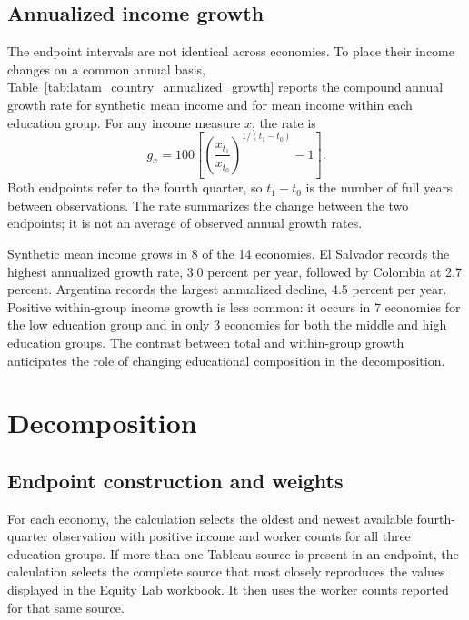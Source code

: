 \documentclass[11pt]{article}
\begin{document}


\subsection{Annualized income growth}

The endpoint intervals are not identical across economies. To place their
income changes on a common annual basis,
Table~\ref{tab:latam_country_annualized_growth} reports the compound annual
growth rate for synthetic mean income and for mean income within each
education group. For any income measure \(x\), the rate is
\[
  g_x=100\left[
    \left(\frac{x_{t_1}}{x_{t_0}}\right)^{1/(t_1-t_0)}-1
  \right].
\]
Both endpoints refer to the fourth quarter, so \(t_1-t_0\) is the number of
full years between observations. The rate summarizes the change between the
two endpoints; it is not an average of observed annual growth rates.



Synthetic mean income grows in 8 of the 14 economies. El Salvador records the
highest annualized growth rate, 3.0 percent per year, followed by Colombia at
2.7 percent. Argentina records the largest annualized decline, 4.5 percent
per year. Positive within-group income growth is less common: it occurs in 7
economies for the low education group and in only 3 economies for both the
middle and high education groups. The contrast between total and
within-group growth anticipates the role of changing educational composition
in the decomposition.

\section{Decomposition}

\subsection{Endpoint construction and weights}

For each economy, the calculation selects the oldest and newest available
fourth-quarter observation with positive income and worker counts for all
three education groups. If more than one Tableau source is present in an
endpoint, the calculation selects the complete source that most closely
reproduces the values displayed in the Equity Lab workbook. It then uses the
worker counts reported for that same source.
\end{document}
